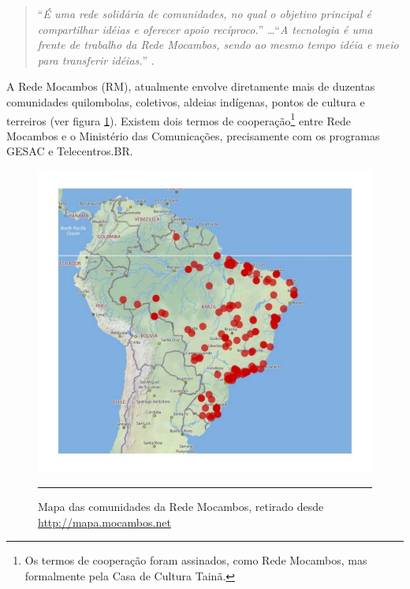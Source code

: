 \begin{quote}
  ``\emph{É uma rede solidária de comunidades, no qual o objetivo
    principal é compartilhar idéias e oferecer apoio recíproco.}''
  \ldots ``\emph{A tecnologia é uma frente de trabalho da Rede
    Mocambos, sendo ao mesmo tempo idéia e meio para transferir
    idéias.}'' \citep{RMSobre}.
\end{quote}

A Rede Mocambos (RM), atualmente envolve diretamente mais de duzentas
comunidades quilombolas, coletivos, aldeias indígenas, pontos de
cultura e terreiros (ver figura \ref{fig:MappaRedeMocambos}). Existem
dois termos de cooperação\footnote{Os termos de cooperação foram
  assinados, como Rede Mocambos, mas formalmente pela Casa de Cultura
  Tainã.} entre Rede Mocambos e o Ministério das Comunicações,
precisamente com os programas GESAC e Telecentros.BR.

\begin{figure}[htbp]
  \centering
  \includegraphics[width=\textwidth]{./Figure/MappaRedeMocambos.pdf}
  \rule{35em}{0.5pt}
  \caption[Mapa das comunidades da Rede Mocambos, retirado desde
  \url{http://mapa.mocambos.net}]{Mapa das comunidades da Rede Mocambos, retirado desde
  \url{http://mapa.mocambos.net}}
  \label{fig:MappaRedeMocambos}
\end{figure}

